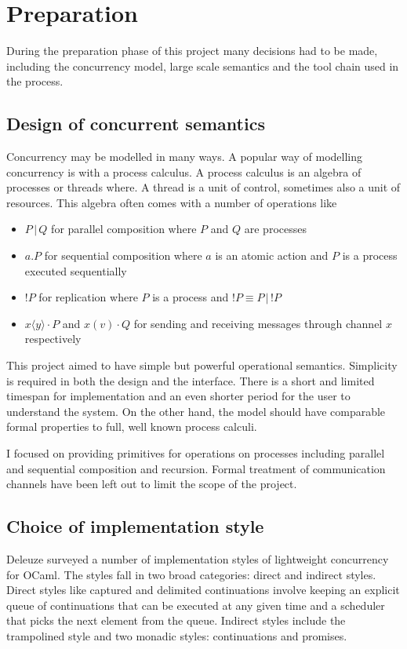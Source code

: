 \documentclass[12pt,twoside,notitlepage]{report}
\begin{document}
\chapter{Preparation}
During the preparation phase of this project many decisions had to be made, including the concurrency model, large scale semantics and the tool chain used in the process.

\section{Design of concurrent semantics}
Concurrency may be modelled in many ways. A popular way of modelling concurrency is with a process calculus. A process calculus is an algebra of processes or threads where. A thread is a unit of control, sometimes also a unit of resources. This algebra often comes with a number of operations like 
\begin{itemize}
\item{$ P\, | \, Q $  for parallel composition where $ P $ and $ Q $ are processes}
\item{ $ a.P  $ for sequential composition where $ a $ is an atomic action and $ P $ is a process executed sequentially}
\item{$ !P $ for replication where $ P $ is a process and $ !P \equiv P \, | \, !P $}
\item{$ x\langle y \rangle \cdot P $ and $ x(v) \cdot Q $ for sending and receiving messages through channel $ x $ respectively} 
\end{itemize}


This project aimed to have simple but powerful operational semantics. Simplicity is required in both the design and the interface. There is a short and limited timespan for implementation and an even shorter period for the user to understand the system. On the other hand, the model should have comparable formal properties to full, well known process calculi. 

I focused on providing primitives for operations on processes including parallel and sequential composition and recursion. Formal treatment of communication channels have been left out to limit the scope of the project.  


\section{Choice of implementation style}  
Deleuze\cite{deleuzelight} surveyed a number of implementation styles of lightweight concurrency for OCaml. The styles fall in two broad categories: direct and indirect styles. Direct styles like captured and delimited continuations involve keeping an explicit queue of continuations that can be executed at any given time and a scheduler that picks the next element from the queue. Indirect styles include the trampolined style and two monadic styles: continuations and promises.
\end{document}

